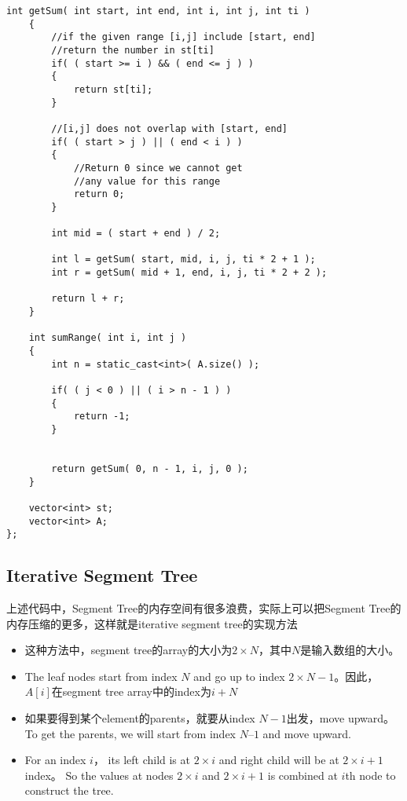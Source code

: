 \begin{lstlisting}[style=customc, caption={Solution Code With Segment Tree}]
    int getSum( int start, int end, int i, int j, int ti )
    {
        //if the given range [i,j] include [start, end]
        //return the number in st[ti]
        if( ( start >= i ) && ( end <= j ) )
        {
            return st[ti];
        }

        //[i,j] does not overlap with [start, end]
        if( ( start > j ) || ( end < i ) )
        {
            //Return 0 since we cannot get
            //any value for this range
            return 0;
        }

        int mid = ( start + end ) / 2;

        int l = getSum( start, mid, i, j, ti * 2 + 1 );
        int r = getSum( mid + 1, end, i, j, ti * 2 + 2 );

        return l + r;
    }

    int sumRange( int i, int j )
    {
        int n = static_cast<int>( A.size() );

        if( ( j < 0 ) || ( i > n - 1 ) )
        {
            return -1;
        }


        return getSum( 0, n - 1, i, j, 0 );
    }

    vector<int> st;
    vector<int> A;
};

\end{lstlisting}

\subsection{Iterative Segment Tree}
上述代码中，Segment Tree的内存空间有很多浪费，实际上可以把Segment Tree的内存压缩的更多，这样就是iterative segment tree的实现方法
\begin{itemize}
\item 这种方法中，segment tree的array的大小为$2\times N$，其中$N$是输入数组的大小。

\item The leaf nodes start from index $N$ and go up to index $ 2\times N -1 $。因此，$A[i]$在segment tree array中的index为$ i+N $
\item 如果要得到某个element的parents，就要从index $ N-1 $出发，move upward。 To get the parents, we will start from index $N – 1$ and move upward. 

\item For an index $ i $， its left child is at $ 2\times i $ and right child will be at $ 2\times i + 1 $ index。 So the values at nodes $ 2\times i $ and $ 2\times i + 1 $ is combined at $i$th node to construct the tree.
\end{itemize}

